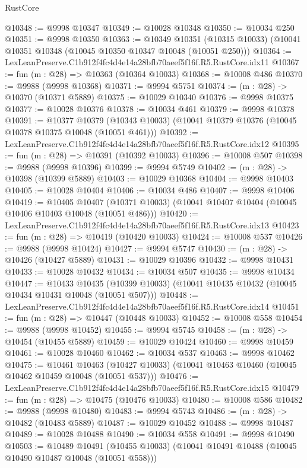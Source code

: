 \begin{lexlean}{RustCore}
\begin{coremodule}
@10348 := @9998 @10347
@10349 := @10028 @10348
@10350 := @10034 @250
@10351 := @9998 @10350
@10363 := @10349
    @10351
    (@10315 @10033)
    (@10041 @10351 @10348 (@10045 @10350 @10347 @10048 (@10051 @250)))
@10364 := LexLeanPreserve.C1b912f4fc4d4e14a28bfb70aeef5f16f.R5.RustCore.idx11
@10367 := fun (m : @28) => @10363 (@10364 @10033)
@10368 := @10008 @486
@10370 := @9988 (@9998 @10368)
@10371 := @9994 @5751
@10374 := (m : @28) -> @10370 (@10371 @5889)
@10375 := @10029 @10340
@10376 := @9998 @10375
@10377 := @10028 @10376
@10378 := @10034 @461
@10379 := @9998 @10378
@10391 := @10377
    @10379
    (@10343 @10033)
    (@10041 @10379 @10376 (@10045 @10378 @10375 @10048 (@10051 @461)))
@10392 := LexLeanPreserve.C1b912f4fc4d4e14a28bfb70aeef5f16f.R5.RustCore.idx12
@10395 := fun (m : @28) => @10391 (@10392 @10033)
@10396 := @10008 @507
@10398 := @9988 (@9998 @10396)
@10399 := @9994 @5749
@10402 := (m : @28) -> @10398 (@10399 @5889)
@10403 := @10029 @10368
@10404 := @9998 @10403
@10405 := @10028 @10404
@10406 := @10034 @486
@10407 := @9998 @10406
@10419 := @10405
    @10407
    (@10371 @10033)
    (@10041 @10407 @10404 (@10045 @10406 @10403 @10048 (@10051 @486)))
@10420 := LexLeanPreserve.C1b912f4fc4d4e14a28bfb70aeef5f16f.R5.RustCore.idx13
@10423 := fun (m : @28) => @10419 (@10420 @10033)
@10424 := @10008 @537
@10426 := @9988 (@9998 @10424)
@10427 := @9994 @5747
@10430 := (m : @28) -> @10426 (@10427 @5889)
@10431 := @10029 @10396
@10432 := @9998 @10431
@10433 := @10028 @10432
@10434 := @10034 @507
@10435 := @9998 @10434
@10447 := @10433
    @10435
    (@10399 @10033)
    (@10041 @10435 @10432 (@10045 @10434 @10431 @10048 (@10051 @507)))
@10448 := LexLeanPreserve.C1b912f4fc4d4e14a28bfb70aeef5f16f.R5.RustCore.idx14
@10451 := fun (m : @28) => @10447 (@10448 @10033)
@10452 := @10008 @558
@10454 := @9988 (@9998 @10452)
@10455 := @9994 @5745
@10458 := (m : @28) -> @10454 (@10455 @5889)
@10459 := @10029 @10424
@10460 := @9998 @10459
@10461 := @10028 @10460
@10462 := @10034 @537
@10463 := @9998 @10462
@10475 := @10461
    @10463
    (@10427 @10033)
    (@10041 @10463 @10460 (@10045 @10462 @10459 @10048 (@10051 @537)))
@10476 := LexLeanPreserve.C1b912f4fc4d4e14a28bfb70aeef5f16f.R5.RustCore.idx15
@10479 := fun (m : @28) => @10475 (@10476 @10033)
@10480 := @10008 @586
@10482 := @9988 (@9998 @10480)
@10483 := @9994 @5743
@10486 := (m : @28) -> @10482 (@10483 @5889)
@10487 := @10029 @10452
@10488 := @9998 @10487
@10489 := @10028 @10488
@10490 := @10034 @558
@10491 := @9998 @10490
@10503 := @10489
    @10491
    (@10455 @10033)
    (@10041 @10491 @10488 (@10045 @10490 @10487 @10048 (@10051 @558)))

\end{coremodule}
\end{lexlean}
